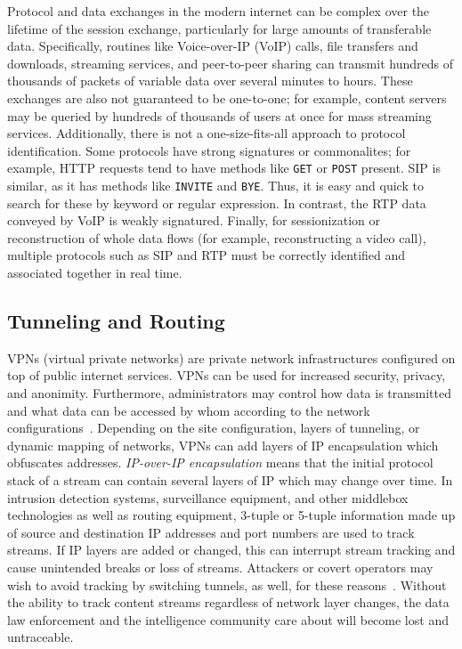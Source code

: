 Protocol and data exchanges in the modern internet can be complex over the lifetime of the session exchange, particularly for large amounts of transferable data. Specifically, routines like Voice-over-IP (VoIP) calls, file transfers and downloads, streaming services, and peer-to-peer sharing can transmit hundreds of thousands of packets of variable data over several minutes to hours. These exchanges are also not guaranteed to be one-to-one; for example, content servers may be queried by hundreds of thousands of users at once for mass streaming services. Additionally, there is not a one-size-fits-all approach to protocol identification. Some protocols have strong signatures or commonalites; for example, HTTP requests tend to have methods like \texttt{GET} or \texttt{POST} present. SIP is similar, as it has methods like \texttt{INVITE} and \texttt{BYE}. Thus, it is easy and quick to search for these by keyword or regular expression. In contrast, the RTP data conveyed by VoIP is weakly signatured. Finally, for sessionization or reconstruction of whole data flows (for example, reconstructing a video call), multiple protocols such as SIP and RTP must be correctly identified and associated together in real time.

\subsection{Tunneling and Routing}

VPNs (virtual private networks) are private network infrastructures configured on top of public internet services. VPNs can be used for increased security, privacy, and anonimity. Furthermore, administrators may control how data is transmitted and what data can be accessed by whom according to the network configurations~\cite{Zhipeng2018VPNAB}. Depending on the site configuration, layers of tunneling, or dynamic mapping of networks, VPNs can add layers of IP encapsulation which obfuscates addresses. \textit{IP-over-IP encapsulation} means that the initial protocol stack of a stream can contain several layers of IP which may change over time. In intrusion detection systems, surveillance equipment, and other middlebox technologies as well as routing equipment, 3-tuple or 5-tuple information made up of source and destination IP addresses and port numbers are used to track streams. If IP layers are added or changed, this can interrupt stream tracking and cause unintended breaks or loss of streams. Attackers or covert operators may wish to avoid tracking by switching tunnels, as well, for these reasons~\cite{iscx-vpn-paper}. Without the ability to track content streams regardless of network layer changes, the data law enforcement and the intelligence community care about will become lost and untraceable.

